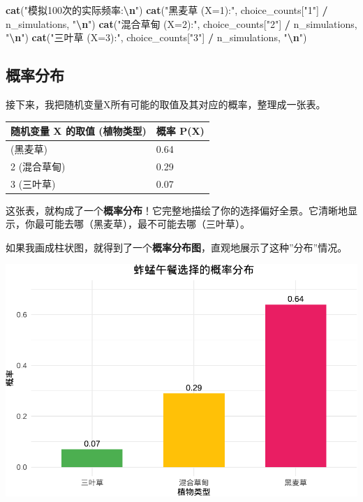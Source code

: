 \documentclass[
]{book}
\newenvironment{Shaded}{\begin{snugshade}}{\end{snugshade}}
\newcommand{\FunctionTok}[1]{\textcolor[rgb]{0.13,0.29,0.53}{\textbf{#1}}}
\newcommand{\NormalTok}[1]{#1}
\newcommand{\SpecialCharTok}[1]{\textcolor[rgb]{0.81,0.36,0.00}{\textbf{#1}}}
\newcommand{\StringTok}[1]{\textcolor[rgb]{0.31,0.60,0.02}{#1}}
\begin{document}
\begin{Shaded}
\begin{Highlighting}[]
\FunctionTok{cat}\NormalTok{(}\StringTok{"模拟100次的实际频率:}\SpecialCharTok{\textbackslash{}n}\StringTok{"}\NormalTok{)}
\FunctionTok{cat}\NormalTok{(}\StringTok{"黑麦草 (X=1):"}\NormalTok{, choice\_counts[}\StringTok{"1"}\NormalTok{] }\SpecialCharTok{/}\NormalTok{ n\_simulations, }\StringTok{"}\SpecialCharTok{\textbackslash{}n}\StringTok{"}\NormalTok{)}
\FunctionTok{cat}\NormalTok{(}\StringTok{"混合草甸 (X=2):"}\NormalTok{, choice\_counts[}\StringTok{"2"}\NormalTok{] }\SpecialCharTok{/}\NormalTok{ n\_simulations, }\StringTok{"}\SpecialCharTok{\textbackslash{}n}\StringTok{"}\NormalTok{)}
\FunctionTok{cat}\NormalTok{(}\StringTok{"三叶草 (X=3):"}\NormalTok{, choice\_counts[}\StringTok{"3"}\NormalTok{] }\SpecialCharTok{/}\NormalTok{ n\_simulations, }\StringTok{"}\SpecialCharTok{\textbackslash{}n}\StringTok{"}\NormalTok{)}
\end{Highlighting}
\end{Shaded}

\hypertarget{ux6982ux7387ux5206ux5e03}{%
\subsection{概率分布}\label{ux6982ux7387ux5206ux5e03}}

接下来，我把随机变量X所有可能的取值及其对应的概率，整理成一张表。

\begin{longtable}[]{@{}ll@{}}
\toprule\noalign{}
随机变量 X 的取值 (植物类型) & 概率 P(X) \\
\midrule\noalign{}
\endhead
\bottomrule\noalign{}
\endlastfoot
1 (黑麦草) & 0.64 \\
2 (混合草甸) & 0.29 \\
3 (三叶草) & 0.07 \\
\end{longtable}

这张表，就构成了一个\textbf{概率分布}！它完整地描绘了你的选择偏好全景。它清晰地显示，你最可能去哪（黑麦草），最不可能去哪（三叶草）。

如果我画成柱状图，就得到了一个\textbf{概率分布图}，直观地展示了这种''分布''情况。

\begin{center}\includegraphics[width=0.8\linewidth]{ecological-statistics_files/figure-latex/unnamed-chunk-17-1} \end{center}
\end{document}
